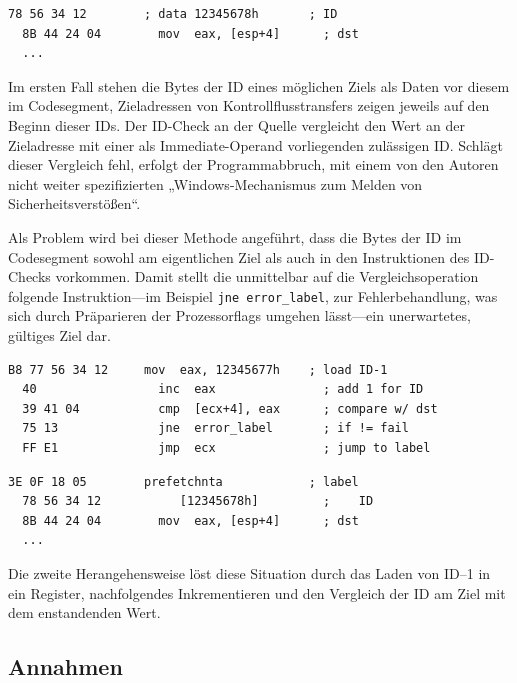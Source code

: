 \documentclass[11pt]{article}
\begin{document}
\begin{lstlisting}[title=Ziel]
  78 56 34 12        ; data 12345678h       ; ID
  8B 44 24 04        mov  eax, [esp+4]      ; dst
  ...
\end{lstlisting}

Im ersten Fall stehen die Bytes der ID eines möglichen Ziels als Daten vor
diesem im Codesegment, Zieladressen von Kontrollflusstransfers zeigen jeweils
auf den Beginn dieser IDs. Der ID-Check an der Quelle vergleicht den Wert an
der Zieladresse mit einer als Immediate-Operand vorliegenden zulässigen ID.
Schlägt dieser Vergleich fehl, erfolgt der Programmabbruch, mit einem von den
Autoren nicht weiter spezifizierten „Windows-Mechanismus zum Melden von
Sicherheitsverstößen“.

Als Problem wird bei dieser Methode angeführt, dass die Bytes der ID im
Codesegment sowohl am eigentlichen Ziel als auch in den Instruktionen des
ID-Checks vorkommen. Damit stellt die unmittelbar auf die Vergleichsoperation
folgende Instruktion—im Beispiel \texttt{jne error\_label}, zur
Fehlerbehandlung, was sich durch Präparieren der Prozessorflags umgehen
lässt—ein unerwartetes, gültiges Ziel dar.

\begin{lstlisting}[title=Quelle]
  B8 77 56 34 12     mov  eax, 12345677h    ; load ID-1
  40                 inc  eax               ; add 1 for ID
  39 41 04           cmp  [ecx+4], eax      ; compare w/ dst
  75 13              jne  error_label       ; if != fail
  FF E1              jmp  ecx               ; jump to label
\end{lstlisting}

\begin{lstlisting}[title=Ziel]
  3E 0F 18 05        prefetchnta            ; label
  78 56 34 12           [12345678h]         ;    ID
  8B 44 24 04        mov  eax, [esp+4]      ; dst
  ...
\end{lstlisting}

Die zweite Herangehensweise löst diese Situation durch das Laden von ID–1 in
ein Register, nachfolgendes Inkrementieren und den Vergleich der ID am Ziel mit
dem enstandenden Wert.

\subsection{Annahmen}
\end{document}

